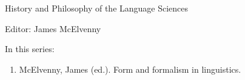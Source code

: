{\large History and Philosophy of the Language Sciences}

\bigskip

Editor: James McElvenny  

 
\bigskip 
In this series:


\small
\begin{enumerate}
\item McElvenny, James (ed.). Form and formalism in linguistics.
\end{enumerate}